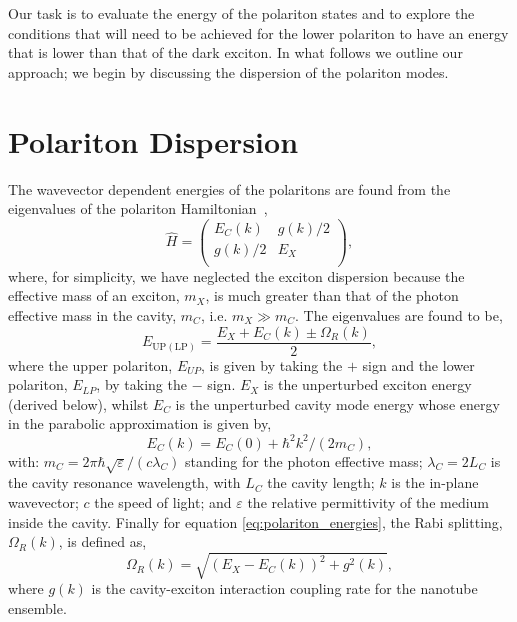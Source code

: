 \documentclass[journal=aamick,manuscript=article]{achemso}
\begin{document}
Our task is to evaluate the energy of the polariton states and to explore the conditions that will need to be achieved for the lower polariton to have an energy that is lower than that of the dark exciton. In what follows we outline our approach; we begin by discussing the dispersion of the polariton modes.\\

\section*{Polariton Dispersion}
The wavevector dependent energies of the polaritons are found from the eigenvalues of the polariton Hamiltonian~\cite{Microcavities},
%
\begin{equation}
\label{polar_Ham}
		\hat{H}=\begin{pmatrix}
		E_C(k) & g(k)/2 \\
        g(k)/2 & E_X    \\
	\end{pmatrix},
\end{equation}
%
where, for simplicity, we have neglected the exciton dispersion because the effective mass of an exciton, $m_X$, is much greater than that of the photon effective mass in the cavity, $m_C$, i.e. $m_X \gg m_C$. The eigenvalues are found to be,
%
\begin{equation}
\label{eq:polariton_energies}
E_{\mathrm{UP(LP)}}=\frac{E_X+E_C(k) \pm \Omega_R(k)}{2},
\end{equation}
%
where the upper polariton, $E_{UP}$, is given by taking the $+$ sign and the lower polariton, $E_{LP}$, by taking the $-$ sign.
$E_X$ is the unperturbed exciton energy (derived below), whilst $E_C$ is the unperturbed cavity mode energy whose energy in the parabolic approximation is given by,
%
\begin{equation}
\label{eq:cavity_mode}
E_C(k) = E_C(0)+{\hbar^2 k^2}/{(2 m_C)},
\end{equation}
%
with: $m_C=2\pi \hbar \sqrt{\varepsilon}/(c\lambda_C)$ standing for the photon effective mass;
$\lambda_C=2L_C$ is the cavity resonance wavelength, with $L_C$ the cavity length; $k$ is the in-plane wavevector; $c$ the speed of light; and $\varepsilon$ the relative permittivity of the medium inside the cavity.
Finally for equation \ref{eq:polariton_energies}, the Rabi splitting, $\Omega_R(k)$, is defined as,
%
\begin{equation}
\label{eq:Rabi_splitting}
\Omega_R(k)=\sqrt{(E_X-E_C(k))^2+g^2(k)},
\end{equation}
%
where $g(k)$ is the cavity-exciton interaction coupling rate for the nanotube ensemble.
\end{document}
